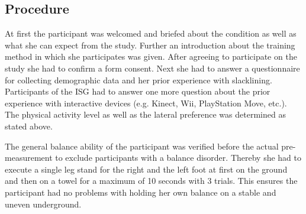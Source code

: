 \subsection{Procedure}
At first the participant was welcomed and briefed about the condition as well as what she can expect from the study.
Further an introduction about the training method in which she participates was given.
After agreeing to participate on the study she had to confirm a form consent.
Next she had to answer a questionnaire for collecting demographic data and her prior experience with slacklining.
Participants of the ISG had to answer one more question about the prior experience with interactive devices (e.g. Kinect, Wii, PlayStation Move, etc.).
The physical activity level as well as the lateral preference was determined as stated above.

The general balance ability of the participant was verified before the actual pre-measurement to exclude participants with a balance disorder.
Thereby she had to execute a single leg stand for the right and the left foot at first on the ground and then on a towel for a maximum of 10 seconds with 3 trials.
This ensures the participant had no problems with holding her own balance on a stable and uneven underground.

